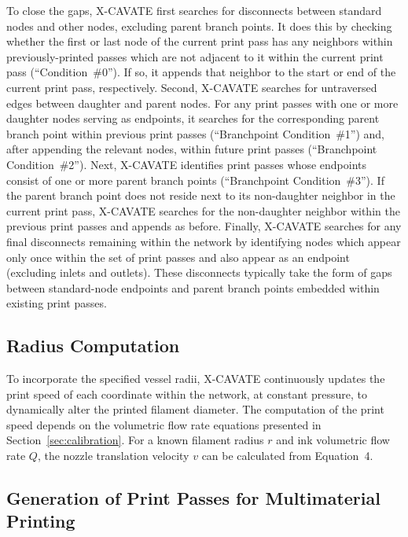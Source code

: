 \documentclass[11pt,letterpaper]{article}
\begin{document}
To close the gaps, X-CAVATE first searches for disconnects between standard
nodes and other nodes, excluding parent branch points. It does this by
checking whether the first or last node of the current print pass has any
neighbors within previously-printed passes which are not adjacent to it within
the current print pass (``Condition~\#0''). If so, it appends that neighbor
to the start or end of the current print pass, respectively. Second, X-CAVATE
searches for untraversed edges between daughter and parent nodes. For any
print passes with one or more daughter nodes serving as endpoints, it searches
for the corresponding parent branch point within previous print passes
(``Branchpoint Condition~\#1'') and, after appending the relevant nodes,
within future print passes (``Branchpoint Condition~\#2''). Next, X-CAVATE
identifies print passes whose endpoints consist of one or more parent branch
points (``Branchpoint Condition~\#3''). If the parent branch point does not
reside next to its non-daughter neighbor in the current print pass, X-CAVATE
searches for the non-daughter neighbor within the previous print passes and
appends as before. Finally, X-CAVATE searches for any final disconnects
remaining within the network by identifying nodes which appear only once within
the set of print passes and also appear as an endpoint (excluding inlets and
outlets). These disconnects typically take the form of gaps between
standard-node endpoints and parent branch points embedded within existing print
passes.

\subsection{Radius Computation}

To incorporate the specified vessel radii, X-CAVATE continuously updates the
print speed of each coordinate within the network, at constant pressure, to
dynamically alter the printed filament diameter. The computation of the print
speed depends on the volumetric flow rate equations presented in
Section~\ref{sec:calibration}. For a known filament radius $r$ and ink
volumetric flow rate $Q$, the nozzle translation velocity $v$ can be
calculated from Equation~4.

\subsection{Generation of Print Passes for Multimaterial Printing}
\end{document}
